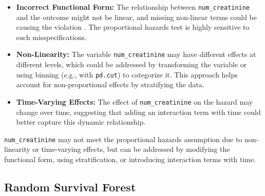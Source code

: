 \begin{itemize}
    \item \textbf{Incorrect Functional Form:} The relationship between \texttt{num\_creatinine} and the outcome might not be linear, and missing non-linear terms could be causing the violation \parencite{harrell__regression_2015}. The proportional hazards test is highly sensitive to such misspecifications.
    \item \textbf{Non-Linearity:} The variable \texttt{num\_creatinine} may have different effects at different levels, which could be addressed by transforming the variable or using binning (e.g., with \texttt{pd.cut}) to categorize it. This approach helps account for non-proportional effects by stratifying the data.
    \item \textbf{Time-Varying Effects:} The effect of \texttt{num\_creatinine} on the hazard may change over time, suggesting that adding an interaction term with time could better capture this dynamic relationship.
\end{itemize}

\noindent \texttt{num\_creatinine} may not meet the proportional hazards assumption due to non-linearity or time-varying effects, but can be addressed by modifying the functional form, using stratification, or introducing interaction terms with time.



\clearpage




\subsection{Random Survival Forest}

